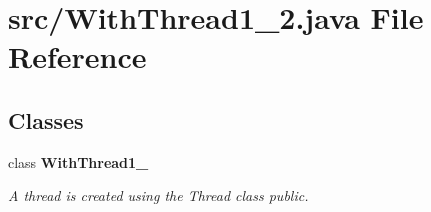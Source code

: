 \section{src/\+With\+Thread1\+\_\+2.java File Reference}
\label{_with_thread1__2_8java}
\subsection*{Classes}
\begin{DoxyCompactItemize}
\item 
class {\bf With\+Thread1\+\_}
\begin{DoxyCompactList}\small\item\em A thread is created using the Thread class  public. \end{DoxyCompactList}\end{DoxyCompactItemize}
